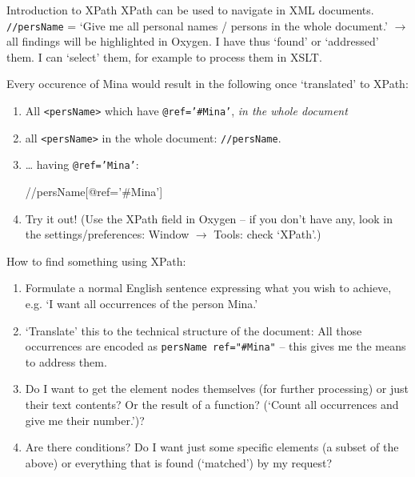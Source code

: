 \begin{frame}{Introduction to XPath}
\small{}
XPath can be used to navigate in XML documents. \\
\texttt{//persName} = `Give me all personal names / persons in the whole document.'  $\to$ all findings will be highlighted in Oxygen. I have thus `found' or `addressed' them. I can `select' them, for example to process them in XSLT.

\begin{block}{}\small 
Every occurence of Mina would result in the following once `translated' to XPath: 
\begin{enumerate}\footnotesize
    \item All \texttt{<persName>} which have \texttt{@ref='\#Mina'}, \emph{in the whole document}
    \item all \texttt{<persName>} in the whole document: \texttt{//persName}.
    \item \dots{} having \texttt{@ref='Mina'}: 
    \begin{xmlcode}
    //persName[@ref='#Mina']
    \end{xmlcode}
    \item Try it out! (Use the XPath field in Oxygen -- if you don't have any, look in the settings/preferences: Window $\to$ Tools: check `XPath'.)
\end{enumerate}
\end{block}

\framebreak

\begin{block}{How to find something using XPath:} 
\begin{enumerate}\small
    \item Formulate a normal English sentence expressing what you wish to achieve, e.g. `I want all occurrences of the person Mina.'
    \item `Translate' this to the technical structure of the document: All those occurrences are encoded as \texttt{persName ref="\#Mina"} -- this gives me the means to address them. 
    \item Do I want to get the element nodes themselves (for further processing) or just their text contents? Or the result of a function? (`Count all occurrences and give me their number.')?
    \item Are there conditions? Do I want just some specific elements (a subset of the above) or everything that is found (`matched') by my request?
\end{enumerate}
\end{block}

\end{frame}

